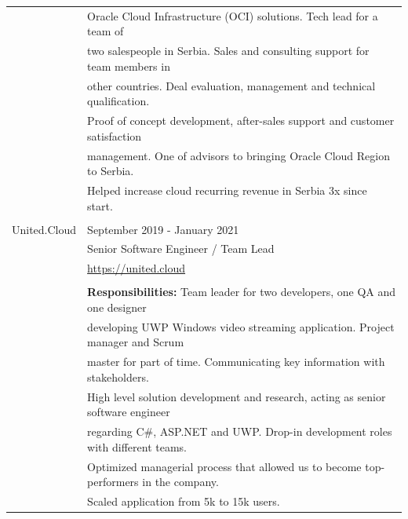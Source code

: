 \documentclass[a4paper]{article}
\begin{document}
\begin{longtable}{@{}r | l}
                   & Oracle Cloud Infrastructure (OCI) solutions. Tech lead for a team of                  \\
                   & two salespeople in Serbia. Sales and consulting support for team members in           \\
                   & other countries. Deal evaluation, management and technical qualification.             \\
                   & Proof of concept development, after-sales support and customer satisfaction           \\
                   & management. One of advisors to bringing Oracle Cloud Region to Serbia.                \\
                   & Helped increase cloud recurring revenue in Serbia 3x since start.                     \\
                   &                                                                                       \\
    United.Cloud   & September 2019 - January 2021                                                         \\
                   & Senior Software Engineer / Team Lead                                                  \\
                   & \href{https://united.cloud}{https://united.cloud}                                     \\
                   &                                                                                       \\
                   & \textbf{Responsibilities:} Team leader for two developers, one QA and one designer    \\
                   & developing UWP Windows video streaming application. Project manager and Scrum         \\
                   & master for part of time. Communicating key information with stakeholders.             \\
                   & High level solution development and research, acting as senior software engineer      \\
                   & regarding C\#, ASP.NET and UWP. Drop-in development roles with different teams.       \\
                   & Optimized managerial process that allowed us to become top-performers in the company. \\
                   & Scaled application from 5k to 15k users.                                              \\

\end{longtable}
\end{document}
